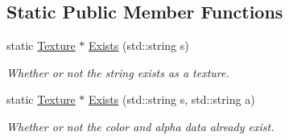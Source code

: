 \subsection*{Static Public Member Functions}
\begin{DoxyCompactItemize}
\item 
static \hyperlink{classTexture}{Texture} $\ast$ \hyperlink{classTexture_a75eeb31b81520a95d67659d780e0bddb}{Exists} (std\+::string s)\hypertarget{classTexture_a75eeb31b81520a95d67659d780e0bddb}{}\label{classTexture_a75eeb31b81520a95d67659d780e0bddb}

\begin{DoxyCompactList}\small\item\em Whether or not the string exists as a texture. \end{DoxyCompactList}\item 
static \hyperlink{classTexture}{Texture} $\ast$ \hyperlink{classTexture_ac937a48949ff7105281199958b549065}{Exists} (std\+::string s, std\+::string a)\hypertarget{classTexture_ac937a48949ff7105281199958b549065}{}\label{classTexture_ac937a48949ff7105281199958b549065}

\begin{DoxyCompactList}\small\item\em Whether or not the color and alpha data already exist. \end{DoxyCompactList}\end{DoxyCompactItemize}
